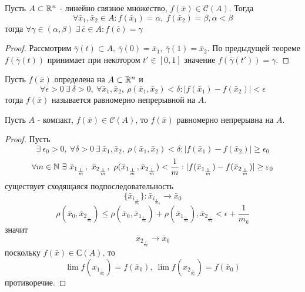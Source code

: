 \begin{theorem}
    Пусть $A\subset \mathbb{R}^n$ - линейно связное множество, $f(\bar{x})\in \mathcal{C}(A)$. Тогда
    \[\forall \bar{x}_1, \bar{x}_2\in A: f(\bar{x}_1)=\alpha,\ f(\bar{x}_2)=\beta, \alpha<\beta\]
    тогда $\forall \gamma\in (\alpha, \beta)\ \exists\ \bar{c}\in A: f(\bar{c})=\gamma$
\end{theorem} 
\begin{proof}
    Рассмотрим $\bar{\gamma}(t)\subset A,\ \bar{\gamma}(0)=\bar{x}_1,\ \bar{\gamma}(1)=\bar{x}_2$. По предыдущей теореме $f(\bar{\gamma}(t))$ принимает при некотором $t'\in [0,1]$ значение $f(\bar{\gamma}(t'))=\gamma$.
\end{proof} 
\begin{definition}
    Пусть $f(\bar{x})$ определена на $A\subset \mathbb{R}^n$ и
    \[\forall \epsilon>0\ \exists\ \delta>0,\ \forall \bar{x}_1, \bar{x}_2,\ \rho(\bar{x}_1, \bar{x}_2)<\delta: |f(\bar{x}_1)-f(\bar{x}_2)|<\epsilon\] 
    тогда $f(\bar{x})$ называется равномерно непрерывной на $A$.
\end{definition} 
\begin{theorem}
    Пусть $A$ - компакт, $f(\bar{x})\in \mathcal{C}(A)$, то $f(\bar{x})$ равномерно непрерывна на $A$.
\end{theorem} 
\begin{proof}
    Пусть 
    \[\exists\ \epsilon_0>0,\ \forall \delta>0\ \exists\ \bar{x}_{1}, \bar{x}_2,\ \rho(\bar{x}_1, \bar{x}_2)<\delta: |f(\bar{x}_1)-f(\bar{x}_2)|\geq \epsilon_0\]
    \[\forall m\in \N\ \exists\ \bar{x}_{1_{\frac{1}{m}}},\ \bar{x}_{2_{\frac{1}{m}}},\ \rho(\bar{x}_{1_{\frac{1}{m}}}, \bar{x}_{2_{\frac{1}{m}}})<\frac{1}{m}: |f(\bar{x}_{1_{\frac{1}{m}}})-f(\bar{x}_{2_{\frac{1}{m}}})|\geq \epsilon_0\]
    существует сходящаяся подпоследовательность
    \[\{\bar{x}_{i_{\frac{1}{m_k}}}\}: \bar{x}_{i_{\frac{1}{m}_k}}\to \bar{x}_0\]
    \[\rho(\bar{x}_0, \bar{x}_{2_{\frac{1}{m_k}}})\leq \rho(\bar{x}_0, \bar{x}_{1_{\frac{1}{m_k}}})+\rho(\bar{x}_{1_{\frac{1}{m_k}}}), \bar{x}_{2_{\frac{1}{m_k}}}<\epsilon+\frac{1}{m_k}\]
    значит 
    \[\bar{x}_{2_{\frac{1}{m_k}}}\to \bar{x}_0\]
    поскольку $f(\bar{x})\in \mathcal{С}(A)$, то
    \[\lim\limits f(x_{1_{\frac{1}{m_k}}})=f(\bar{x}_0),\ \lim\limits f(x_{2_{\frac{1}{m_k}}})=f(\bar{x}_0)\]
    противоречие.
\end{proof} 
